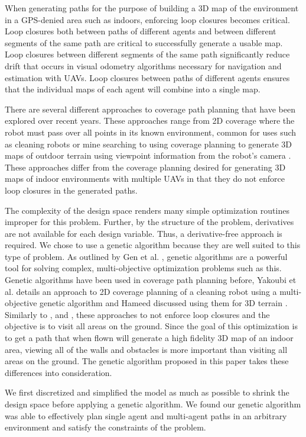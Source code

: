 \documentclass[letterpaper, 10 pt, conference]{ieeeconf}  %
\begin{document}
When generating paths for the purpose of building a 3D map of the environment in a GPS-denied area such as indoors, enforcing loop closures becomes critical. Loop closures both between paths of different agents and between different segments of the same path are critical to successfully generate a usable map. Loop closures between different segments of the same path significantly reduce drift that occurs in visual odometry algorithms necessary for navigation and estimation with UAVs. Loop closures between paths of different agents ensures that the individual maps of each agent will combine into a single map.

There are several different approaches to coverage path planning that have been explored over recent years. These approaches range from 2D coverage where the robot must pass over all points in its known environment, common for uses such as cleaning robots or mine searching \cite{Choset2001} to using coverage planning to generate 3D maps of outdoor terrain using viewpoint information from the robot's camera \cite{Bircher2016}. These approaches differ from the coverage planning desired for generating 3D maps of indoor environments with multiple UAVs in that they do not enforce loop closures in the generated paths.

The complexity of the design space renders many simple optimization routines improper for this problem. Further, by the structure of the problem, derivatives are not available for each design variable. Thus, a derivative-free approach is required. We chose to use a genetic algorithm because they are well suited to this type of problem. As outlined by Gen et al. \cite{Gen2000}, genetic algorithms are a powerful tool for solving complex, multi-objective optimization problems such as this. Genetic algorithms have been used in coverage path planning before, Yakoubi et al. details an approach to 2D coverage planning of a cleaning robot using a multi-objective genetic algorithm \cite{Yakoubi2016} and Hameed discussed using them for 3D terrain \cite{Hameed2014}. Similarly to \cite{Choset2001}, and \cite{Bircher2016}, these approaches to not enforce loop closures and the objective is to visit all areas on the ground. Since the goal of this optimization is to get a path that when flown will generate a high fidelity 3D map of an indoor area, viewing all of the walls and obstacles is more important than visiting all areas on the ground. The genetic algorithm proposed in this paper takes these differences into consideration.

We first discretized and simplified the model as much as possible to shrink the design space before applying a genetic algorithm. We found our genetic algorithm was able to effectively plan single agent and multi-agent paths in an arbitrary environment and satisfy the constraints of the problem.
\end{document}

